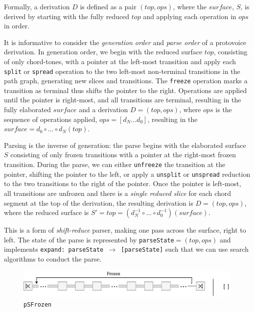 \documentclass[12pt,a4paper,twoside,openright]{report} \usepackage[pdfborder={0 0 0}]{hyperref}    %
\theoremstyle{definition} \newtheorem{definition}{Definition}[section]
\begin{document}
      Formally, a derivation $D$ is defined as a pair $(top, ops)$, where the $surface$, $S$, is derived by starting
      with the fully reduced $top$ and applying each operation in $ops$ in order. 

      It is informative to consider the \textit{generation order} and \textit{parse order} of a protovoice derivation.
      In generation order, we begin with the reduced surface $top$, consisting of only chord-tones, with a pointer at
      the left-most transition and apply each \texttt{split} or \texttt{spread} operation to the two left-most
      non-terminal transitions in the path graph, generating new slices and transitions. The \texttt{freeze} operation
      marks a transition as terminal thus shifts the pointer to the right. Operations are applied until the pointer is
      right-most, and all transitions are terminal, resulting in the fully elaborated $surface$ and a derivation
      $D=(top, ops)$, where $ops$ is the sequence of operations applied, $ops = [d_N \dots d_0]$, resulting in the
      $surface = d_0 \circ \dots \circ d_N (top) $.

      Parsing is the inverse of generation: the parse begins with the elaborated surface $S$ consisting of only frozen
      transitions with a pointer at the right-most frozen transition. During the parse, we can either \texttt{unfreeze}
      the transition at the pointer, shifting the pointer to the left, or apply a \texttt{unsplit} or \texttt{unspread}
      reduction to the two transitions to the right of the pointer. Once the pointer is left-most, all transitions are
      unfrozen and there is a \textit{single reduced slice} for each chord segment at the top of the derivation, the
      resulting derivation is $D = (top, ops)$, where the reduced surface is $S'= top = (d_N^{-1} \circ \dots \circ
      d_0^{-1}) (surface)$.

      This is a form of \textit{shift-reduce} parser, making one pass across the surface, right to left. The state of
      the parse is represented by \texttt{parseState}$= (top, ops)$ and implements \texttt{expand: parseState $\to$
      [parseState]} such that we can use search algorithms to conduct the parse.

      \begin{figure}[h] \centering\includegraphics[width=\textwidth]{impl/parseState/frozen.png}
      \caption{\texttt{pSFrozen}} \label{fig:pSFrozen} \end{figure}
\end{document}
